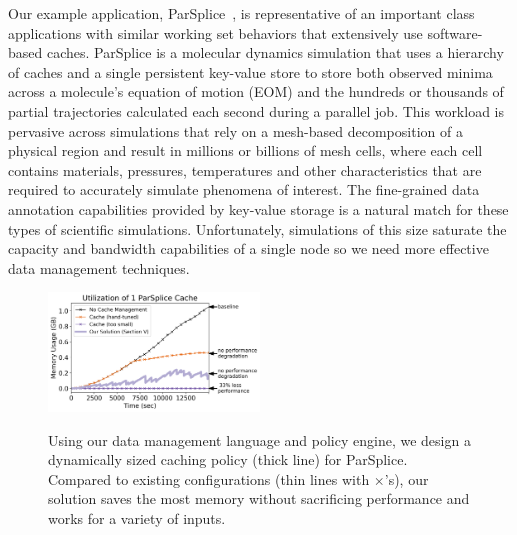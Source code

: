 Our example application, ParSplice~\cite{perez:jctc20150parsplice}, is
representative of an important class applications with similar working set
behaviors that extensively use software-based caches.  ParSplice is a molecular
dynamics simulation that uses a hierarchy of caches and a single persistent
key-value store to store both observed minima across a molecule's equation of
motion (EOM) and the hundreds or thousands of partial trajectories calculated
each second during a parallel job.  This workload is pervasive across
simulations that rely on a mesh-based decomposition of a physical region and
result in millions or billions of mesh cells, where each cell contains
materials, pressures, temperatures and other characteristics that are required
to accurately simulate phenomena of interest.  The fine-grained data annotation
capabilities provided by key-value storage is a natural match for these types
of scientific simulations.  Unfortunately, simulations of this size saturate
the capacity and bandwidth capabilities of a single node so we need more
effective data management techniques.

\begin{figure}[t]
\noindent\includegraphics[width=0.5\textwidth]{figures/cache-management.png}\\
\caption{Using our data management language and policy engine, we design a
dynamically sized caching policy (thick line) for ParSplice.  Compared to
existing configurations (thin lines with \(\times\)'s), our solution saves the most
memory without sacrificing performance and works for a variety of inputs.
\label{fig:cache-management}}
\end{figure}

